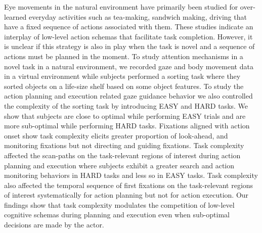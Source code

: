 Eye movements in the natural environment have primarily been studied for over-learned everyday activities such as tea-making, sandwich making, driving that have a fixed sequence of actions associated with them. These studies indicate an interplay of low-level action schemas that facilitate task completion. However, it is unclear if this strategy is also in play when the task is novel and a sequence of actions must be planned in the moment. To study attention mechanisms in a novel task in a natural environment, we recorded gaze and body movement data in a virtual environment while subjects performed a sorting task where they sorted objects on a life-size shelf based on some object features. To study the action planning and execution related gaze guidance behavior we also controlled the complexity of the sorting task by introducing EASY and HARD tasks. We show that subjects are close to optimal while performing EASY trials and are more sub-optimal while performing HARD tasks. Fixations aligned with action onset show task complexity elicits greater proportion of look-ahead, and monitoring fixations but not directing and guiding fixations. Task complexity affected the scan-paths on the task-relevant regions of interest during action planning and execution where subjects exhibit a greater search and action monitoring behaviors in HARD tasks and less so in EASY tasks. Task complexity also affected the temporal sequence of first fixations on the task-relevant regions of interest systematically for action planning but not for action execution. Our findings show that task complexity modulates the competition of low-level cognitive schemas during planning and execution even when sub-optimal decisions are made by the actor.